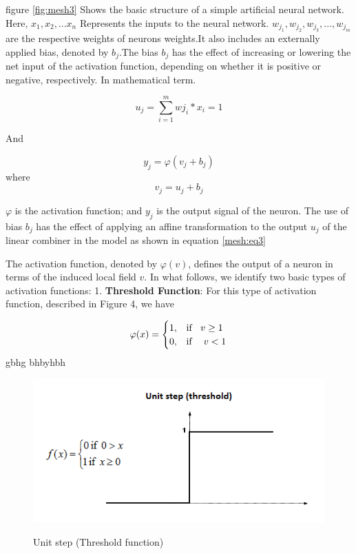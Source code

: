 \documentclass[12pt]{article}
\begin{document}
 figure \ref{fig:mesh3}   Shows the basic structure of a simple artificial neural network. Here, $x_1,x_2,... x_n$ Represents the inputs to the neural network. $w_{j_1}, w_{j_2}, w_{j_3},..., w_{j_m}$ are the respective weights of neurons weights.It also includes an externally applied bias, denoted by $b_j$.The bias $b_j$ has the effect of increasing or lowering the net input of the activation function, depending on whether it is positive or negative, respectively. 
 \newpage
 In mathematical term. 
 
 \begin{equation}
 u_j=\sum_{i=1}^{m} w{j_i}*x_i= 1
 \end{equation}
 
 And
 
 \begin{equation}
    y_j= \varphi(v_j+b_j)
 \end{equation}
 where
 \begin{equation}
    v_j=u_j+b_j
    \label{mesh:eq3}
 \end{equation}
 
 $\varphi$ is the activation function; and $y_j$ is the output signal of the neuron. The use of bias $b_j$ has the effect of applying an affine transformation to the output $u_j$ of the linear combiner in the model as shown in equation \ref{mesh:eq3}
 
 The activation function, denoted by $\varphi(v)$, defines the output of a neuron in terms of
the induced local field $v$. In what follows, we identify two basic types of activation functions: 
\vspace{2mm}
1. \textbf{Threshold Function}: For this type of activation function, described in Figure 4, we have 
	
\[
   \varphi(x)= 
\begin{cases}
    1 ,& \text{if\hspace{2mm} } v \geq 1 \\
       0,              & \text{if\hspace{2mm} }  \ v < 1
\end{cases}
\]
gbhg bhbyhbh
 \begin{figure}[h]
    	\centering
    	\includegraphics[width=0.35 \textwidth]{d.png}
       	\label{fig:mesh4}
	\caption{Unit step (Threshold function)}
	\end{figure} 
\end{document}
